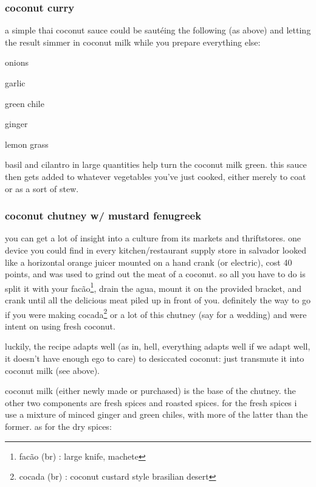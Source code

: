 \subsubsection{coconut curry}

a simple thai coconut sauce could be saut\'{e}ing the following (as above) and 
letting the result simmer in coconut milk while you prepare everything else:

\begin{ingredients}
  \item onions
  \item garlic
  \item green chile
  \item ginger
  \item lemon grass
\end{ingredients}

basil and cilantro in large quantities help turn the coconut milk green. this 
sauce then gets added to whatever vegetables you've just cooked, either merely 
to coat or as a sort of stew.

\subsubsection{coconut chutney w/ mustard fenugreek}

you can get a lot of insight into a culture from its markets and thriftstores. 
one device you could find in every kitchen/restaurant supply store in salvador 
looked like a horizontal orange juicer mounted on a hand crank (or electric), 
cost 40 points, and was used to grind out the meat of a coconut. so all you 
have to do is split it with your fac\~{a}o\footnote{fac\~{a}o (br) : large 
knife, machete}, drain the agua, mount it on the provided bracket, and crank 
until all the delicious meat piled up in front of you. definitely the way to 
go if you were making cocada\footnote{cocada (br) : coconut custard style 
brasilian desert} or a lot of this chutney (say for a wedding) and were intent 
on using fresh coconut.

luckily, the recipe adapts well (as in, hell, everything adapts well if we 
adapt well, it doesn't have enough ego to care) to desiccated coconut: just 
transmute it into coconut milk (see above).

coconut milk (either newly made or purchased) is the base of the chutney. the 
other two components are fresh spices and roasted spices. for the fresh spices 
i use a mixture of minced ginger and green chiles, with more of the latter 
than the former. as for the dry spices:

